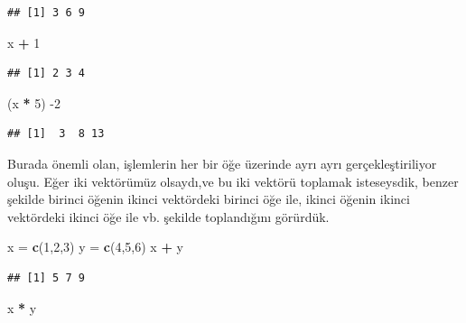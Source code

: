 \documentclass[]{book}
\newenvironment{Shaded}{\begin{snugshade}}{\end{snugshade}}
\newcommand{\DecValTok}[1]{\textcolor[rgb]{0.00,0.00,0.81}{#1}}
\newcommand{\KeywordTok}[1]{\textcolor[rgb]{0.13,0.29,0.53}{\textbf{#1}}}
\newcommand{\NormalTok}[1]{#1}
\newcommand{\OperatorTok}[1]{\textcolor[rgb]{0.81,0.36,0.00}{\textbf{#1}}}
\newcommand{\StringTok}[1]{\textcolor[rgb]{0.31,0.60,0.02}{#1}}
\begin{document}
\begin{verbatim}
## [1] 3 6 9
\end{verbatim}

\begin{Shaded}
\begin{Highlighting}[]
\NormalTok{x }\OperatorTok{+}\StringTok{ }\DecValTok{1}
\end{Highlighting}
\end{Shaded}

\begin{verbatim}
## [1] 2 3 4
\end{verbatim}

\begin{Shaded}
\begin{Highlighting}[]
\NormalTok{(x }\OperatorTok{*}\StringTok{ }\DecValTok{5}\NormalTok{) }\DecValTok{-2}
\end{Highlighting}
\end{Shaded}

\begin{verbatim}
## [1]  3  8 13
\end{verbatim}

Burada önemli olan, işlemlerin her bir öğe üzerinde ayrı ayrı
gerçekleştiriliyor oluşu. Eğer iki vektörümüz olsaydı,ve bu iki vektörü
toplamak isteseysdik, benzer şekilde birinci öğenin ikinci vektördeki
birinci öğe ile, ikinci öğenin ikinci vektördeki ikinci öğe ile vb.
şekilde toplandığını görürdük.

\begin{Shaded}
\begin{Highlighting}[]
\NormalTok{x =}\StringTok{ }\KeywordTok{c}\NormalTok{(}\DecValTok{1}\NormalTok{,}\DecValTok{2}\NormalTok{,}\DecValTok{3}\NormalTok{)}
\NormalTok{y =}\StringTok{ }\KeywordTok{c}\NormalTok{(}\DecValTok{4}\NormalTok{,}\DecValTok{5}\NormalTok{,}\DecValTok{6}\NormalTok{)}
\NormalTok{x }\OperatorTok{+}\StringTok{ }\NormalTok{y}
\end{Highlighting}
\end{Shaded}

\begin{verbatim}
## [1] 5 7 9
\end{verbatim}

\begin{Shaded}
\begin{Highlighting}[]
\NormalTok{x }\OperatorTok{*}\StringTok{ }\NormalTok{y}
\end{Highlighting}
\end{Shaded}
\end{document}
